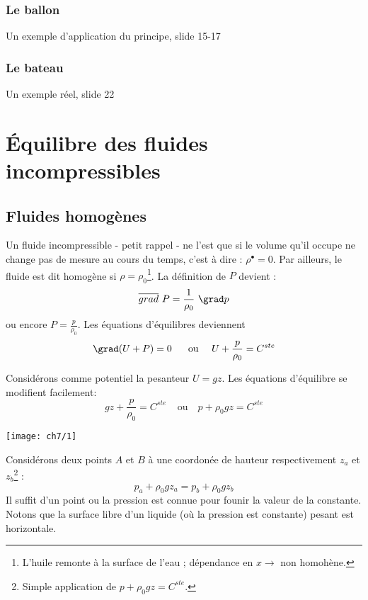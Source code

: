 	    \subsubsection{Le ballon}
	    Un exemple d'application du principe, slide 15-17
	    
	    \subsubsection{Le bateau}
	    Un exemple réel, slide 22
	    

\section{Équilibre des fluides incompressibles}
	\subsection{Fluides homogènes}
	Un fluide incompressible - petit rappel - ne l'est que si le volume qu'il occupe
	ne change pas de mesure au cours du temps, c'est à dire : $\rho^\bullet = 0$. Par 
	ailleurs, le fluide est dit homogène si $\rho = \rho_0$\footnote{L'huile remonte 
	à la surface de l'eau ; dépendance en $x \rightarrow$ non homohène.}. La 
	définition de $P$ 	devient :
	\begin{equation}
	\overline{grad}\ P = \frac{1}{\rho_0}\ \grad p
	\end{equation}
	ou encore $P = \frac{p}{\rho_0}$. Les équations d'équilibres deviennent
	\begin{equation}
	\grad (U + P) = 0\ \ \ \ \ \text{ou }\ \ \ U + \frac{p}{\rho_0} = C^{ste}
	\end{equation}
	
	Considérons comme potentiel la pesanteur $U = gz$. Les équations d'équilibre se
	modifient facilement:
	\begin{equation}
	gz + \frac{p}{\rho_0} = C^{ste}\ \ \ \ \ \text{ou }\ \ \ p+\rho_0gz = C^{ste}
	\end{equation}
\begin{center}
\texttt{[image: ch7/1]}
\end{center}
	
	Considérons deux points $A$ et $B$ à une coordonée de hauteur respectivement 
	$z_a$ et $z_b$\footnote{Simple application de $p+\rho_0gz = C^{ste}$.} :
	\begin{equation}
	p_a +\rho_0 gz_a = p_b +\rho_0gz_b
	\end{equation}
	Il suffit d'un point ou la pression est connue pour founir la valeur de la 
	constante. Notons que la surface libre d'un liquide (où la pression est 
	constante) pesant est horizontale.
	
